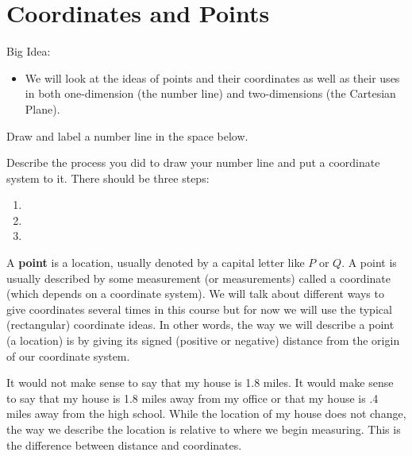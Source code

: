 \section{Coordinates and Points}
Big Idea:
\begin{itemize}
\item We will look at the ideas of points and their coordinates as well as their uses in both one-dimension (the number line) and two-dimensions (the Cartesian Plane).
\end{itemize}

\bq\label{q1} Draw and label a number line in the space below.
\begin{annotation}

\end{annotation}

\vspace{1.5in}

Describe the process you did to draw your number line and put a coordinate system to it. There should be three steps:
\begin{enumerate}
\item
\item
\item
\end{enumerate}

\eq

\begin{info} A \textbf{point} is a location, usually denoted by a capital letter like $P$ or $Q$. A point is usually described by some measurement (or measurements) called a coordinate (which depends on a coordinate system). We will talk about different ways to give coordinates several times in this course but for now we will use the typical (rectangular) coordinate ideas. In other words, the way we will describe a point (a location) is by giving its signed (positive or negative) distance from the origin of our coordinate system.

It would not make sense to say that my house is 1.8 miles. It would make sense to say that my house is 1.8 miles away from my office or that my house is .4 miles away from the high school. While the location of my house does not change, the way we describe the location is relative to where we begin measuring. This is the difference between distance and coordinates. \end{info}

